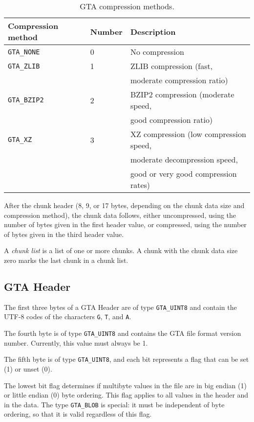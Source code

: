 \documentclass[a4paper,11pt]{article}
\newcommand{\code}[1]{\texttt{#1}}
\begin{document}
\begin{table}
\begin{tabular}{l|l|l}
Compression method & Number & Description\\\hline
\code{GTA\_NONE}  & 0 & No compression \\
\code{GTA\_ZLIB}  & 1 & ZLIB compression (fast,\\
                  &   & moderate compression ratio) \\
\code{GTA\_BZIP2} & 2 & BZIP2 compression (moderate speed,\\
                  &   & good compression ratio) \\
\code{GTA\_XZ}    & 3 & XZ compression (low compression speed,\\
                  &   & moderate decompression speed,\\
		  &   & good or very good compression rates) \\
\end{tabular}
\caption{GTA compression methods.}
\label{tab:compression}
\end{table}

After the chunk header (8, 9, or 17 bytes, depending on the chunk data size
and compression method), the chunk data follows, either uncompressed, using
the number of bytes given in the first header value, or compressed, using
the number of bytes given in the third header value.

A \emph{chunk list} is a list of one or more chunks. A chunk with the chunk
data size zero marks the last chunk in a chunk list.

\subsection{GTA Header}

The first three bytes of a GTA Header are of type \code{GTA\_UINT8} and contain
the UTF-8 codes of the characters \code{G}, \code{T}, and \code{A}.

The fourth byte is of type \code{GTA\_UINT8} and contains the GTA file format
version number. Currently, this value must always be 1.

The fifth byte is of type \code{GTA\_UINT8}, and each bit represents a flag that
can be set (1) or unset (0).

The lowest bit flag determines if multibyte values in the file are in big endian
(1) or little endian (0) byte ordering. This flag applies to all values in the
header and in the data. The type \code{GTA\_BLOB} is special: it must be
independent of byte ordering, so that it is valid regardless of this flag.
\end{document}
